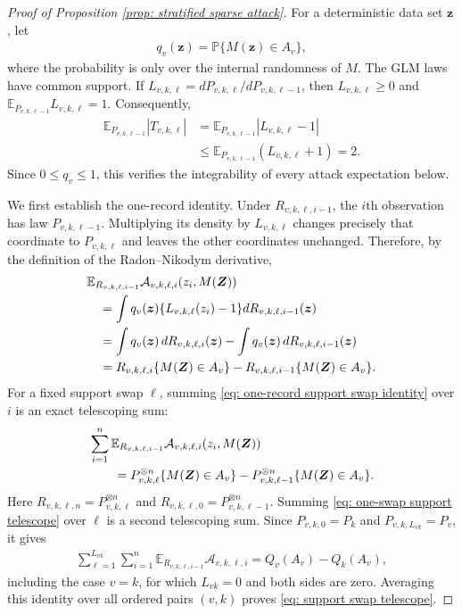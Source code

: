 \documentclass[letterpaper,12pt]{article}
\numberwithin{equation}{section}
\theoremstyle{plain}
\numberwithin{Theorem}{section}
\numberwithin{proposition}{section}
\numberwithin{Lemma}{section}
{
	\theoremstyle{definition}
	\newtheorem{Definition}{Definition}
	\newtheorem{example}{Example}
	\numberwithin{example}{section}
	\newtheorem{fact}{Fact}
	\numberwithin{fact}{section}
	\newtheorem{remark}{Remark}
}
\newcommand{\A}{\mathcal{A}}
\newcommand{\1}{\mathbbm{1}}
\def\Pr{\mathbb P}
\def\E{\mathbb{E}}
\begin{document}
\begin{proof}[Proof of Proposition \ref{prop: stratified sparse attack}]
For a deterministic data set $\bm z$, let
\begin{align*}
    q_v(\bm z)=\Pr\{M(\bm z)\in A_v\},
\end{align*}
where the probability is only over the internal randomness of $M$.
The GLM laws have common support.  If
$L_{v,k,\ell}=dP_{v,k,\ell}/dP_{v,k,\ell-1}$, then
$L_{v,k,\ell}\geq0$ and
$\E_{P_{v,k,\ell-1}}L_{v,k,\ell}=1$.  Consequently,
\begin{align*}
    \E_{P_{v,k,\ell-1}}|T_{v,k,\ell}|
    &=\E_{P_{v,k,\ell-1}}|L_{v,k,\ell}-1|\\
    &\leq \E_{P_{v,k,\ell-1}}(L_{v,k,\ell}+1)=2.
\end{align*}
Since $0\leq q_v\leq1$, this verifies the integrability of every
attack expectation below.

We first establish the one-record identity.  Under
$R_{v,k,\ell,i-1}$, the $i$th observation has law
$P_{v,k,\ell-1}$.  Multiplying its density by $L_{v,k,\ell}$ changes
precisely that coordinate to $P_{v,k,\ell}$ and leaves the other
coordinates unchanged.  Therefore, by the definition of the
Radon--Nikodym derivative,
\begin{align}
&\E_{R_{v,k,\ell,i-1}}
\A_{v,k,\ell,i}(z_i,M(\bm Z))\notag\\
&\quad=\int q_v(\bm z)\{L_{v,k,\ell}(z_i)-1\}
dR_{v,k,\ell,i-1}(\bm z)\notag\\
&\quad=\int q_v(\bm z)\,dR_{v,k,\ell,i}(\bm z)
      -\int q_v(\bm z)\,dR_{v,k,\ell,i-1}(\bm z)\notag\\
&\quad=R_{v,k,\ell,i}\{M(\bm Z)\in A_v\}
      -R_{v,k,\ell,i-1}\{M(\bm Z)\in A_v\}.             \label{eq: one-record support swap identity}
\end{align}
For a fixed support swap $\ell$, summing
\eqref{eq: one-record support swap identity} over $i$ is an exact
telescoping sum:
\begin{align}
&\sum_{i=1}^n\E_{R_{v,k,\ell,i-1}}
\A_{v,k,\ell,i}(z_i,M(\bm Z))\notag\\
&\qquad=P_{v,k,\ell}^{\otimes n}\{M(\bm Z)\in A_v\}
       -P_{v,k,\ell-1}^{\otimes n}\{M(\bm Z)\in A_v\}.   \label{eq: one-swap support telescope}
\end{align}
Here $R_{v,k,\ell,n}=P_{v,k,\ell}^{\otimes n}$ and
$R_{v,k,\ell,0}=P_{v,k,\ell-1}^{\otimes n}$.
Summing \eqref{eq: one-swap support telescope} over $\ell$ is a
second telescoping sum.  Since $P_{v,k,0}=P_k$ and
$P_{v,k,L_{vk}}=P_v$, it gives
\begin{align*}
\sum_{\ell=1}^{L_{vk}}\sum_{i=1}^n
\E_{R_{v,k,\ell,i-1}}\A_{v,k,\ell,i}
=Q_v(A_v)-Q_k(A_v),
\end{align*}
including the case $v=k$, for which $L_{vk}=0$ and both sides are
zero.  Averaging this identity over all ordered pairs $(v,k)$ proves
\eqref{eq: support swap telescope}.


\end{proof}
\end{document}
